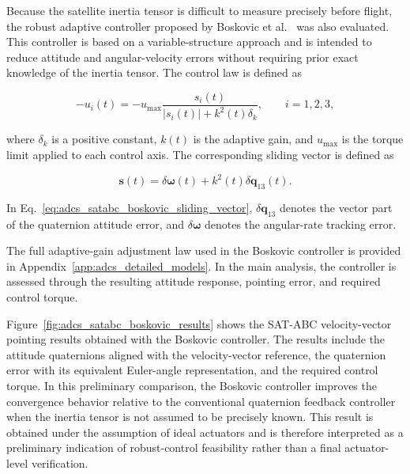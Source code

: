 Because the satellite inertia tensor is difficult to measure precisely before flight, the robust adaptive controller proposed by Boskovic et al.~\cite{Boskovic2004} was also evaluated. This controller is based on a variable-structure approach and is intended to reduce attitude and angular-velocity errors without requiring prior exact knowledge of the inertia tensor. The control law is defined as

\begin{equation}
    -u_i(t)
    =
    -u_{\max}
    \frac{
        s_i(t)
    }{
        |s_i(t)| + k^2(t)\delta_k
    },
    \qquad
    i = 1,2,3,
    \label{eq:adcs_satabc_boskovic_control}
\end{equation}

where \(\delta_k\) is a positive constant, \(k(t)\) is the adaptive gain, and \(u_{\max}\) is the torque limit applied to each control axis. The corresponding sliding vector is defined as

\begin{equation}
    \mathbf{s}(t)
    =
    \delta\boldsymbol{\omega}(t)
    +
    k^2(t)\delta\mathbf{q}_{13}(t).
    \label{eq:adcs_satabc_boskovic_sliding_vector}
\end{equation}

In Eq.~\eqref{eq:adcs_satabc_boskovic_sliding_vector}, \(\delta\mathbf{q}_{13}\) denotes the vector part of the quaternion attitude error, and \(\delta\boldsymbol{\omega}\) denotes the angular-rate tracking error. 

The full adaptive-gain adjustment law used in the Boskovic controller is provided in Appendix~\ref{app:adcs_detailed_models}. In the main analysis, the controller is assessed through the resulting attitude response, pointing error, and required control torque.

Figure~\ref{fig:adcs_satabc_boskovic_results} shows the SAT-ABC velocity-vector pointing results obtained with the Boskovic controller. The results include the attitude quaternions aligned with the velocity-vector reference, the quaternion error with its equivalent Euler-angle representation, and the required control torque. In this preliminary comparison, the Boskovic controller improves the convergence behavior relative to the conventional quaternion feedback controller when the inertia tensor is not assumed to be precisely known. This result is obtained under the assumption of ideal actuators and is therefore interpreted as a preliminary indication of robust-control feasibility rather than a final actuator-level verification.

